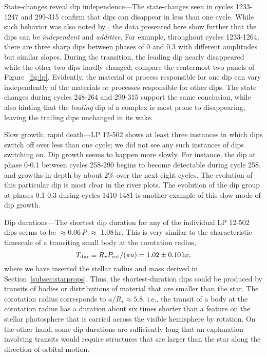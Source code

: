 \documentclass[11pt,twocolumn,tighten]{aastex63}
\begin{document}
{\sc State-changes reveal dip independence}---The state-changes seen
in cycles 1233-1247 and 299-315 confirm that dips can disappear in
less than one cycle. While such behavior was also noted by
\cite{2017AJ....153..152S}, the data presented here show further that
the dips can be {\it independent} and {\it additive}.  For example,
throughout cycles 1233-1264, there are three sharp dips between phases
of 0 and 0.3 with different amplitudes but similar slopes.  During the
transition, the leading dip nearly disappeared while the other two
dips hardly changed; compare the centermost two panels of
Figure~\ref{fig:lp}.  Evidently, the material or process responsible
for one dip can vary independently of the materials or processes
responsible for other dips.  The state changes during cycles 248-264
and 299-315 support the same conclusion, while also hinting that the
{\it leading} dip of a complex is most prone to disappearing, leaving
the trailing dips unchanged in its wake.


{\sc Slow growth; rapid death}---LP 12-502 shows at least three
instances in which dips switch off over less than one cycle; we did
not see any such instances of dips switching on.  Dip growth seems to
happen more slowly.  For instance, the dip at phase 0-0.1 between
cycles 258-290 begins to become detectable during cycle 258, and
growths in depth by about 2\% over the next eight cycles.  The
evolution of this particular dip is most clear in the river plots.
The evolution of the dip group at phases 0.1-0.3 during cycles
1410-1481 is another example of this slow mode of dip growth.


{\sc Dip durations}---The shortest dip duration for any of the
individual LP 12-502 dips seems to be $\approx$0.06\,$P$ $\approx$
1.08\,hr.  This is very similar to the characteristic timescale of a
transiting small body at the corotation radius,
\begin{equation}
T_{\rm dur} \equiv R_\star P_{\rm rot} / (\pi a) = 1.02\pm 0.10\,{\rm hr},
\end{equation}
where we have inserted the stellar radius and mass derived in
Section~\ref{subsec:starprops}.  Thus, the shortest-duration dips
could be produced by transits of bodies or distributions of material
that are smaller than the star.  The corotation radius corresponds to
$a/R_\star \approx 5.8$, i.e., the transit of a body at the corotation
radius has a duration about six times shorter than a feature on the
stellar photosphere that is carried across the visible hemisphere by
rotation.  On the other hand, some dip durations are sufficiently long
that an explanation involving transits would require structures that
are larger than the star along the direction of orbital motion.
\end{document}
